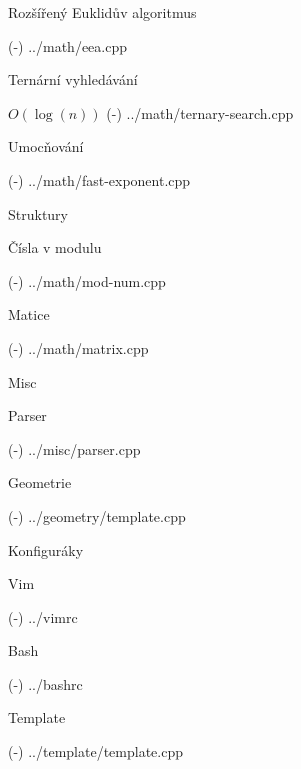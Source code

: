 \sec Rozšířený Euklidův algoritmus 

\verbinput (-) ../math/eea.cpp

\sec Ternární vyhledávání 

$O(\log(n))$
\verbinput (-) ../math/ternary-search.cpp

\sec Umocňování 

\verbinput (-) ../math/fast-exponent.cpp

\sec Struktury 

\secc Čísla v modulu 

\verbinput (-) ../math/mod-num.cpp

\secc Matice 

\verbinput (-) ../math/matrix.cpp

\newpage

\chap Misc

\sec Parser 

\verbinput (-) ../misc/parser.cpp

\newpage

\chap Geometrie

\verbinput (-) ../geometry/template.cpp

\newpage

\chap Konfiguráky

\sec Vim 

\verbinput (-) ../vimrc

\sec Bash 

\verbinput (-) ../bashrc

\sec Template 

\verbinput (-) ../template/template.cpp

\bye
